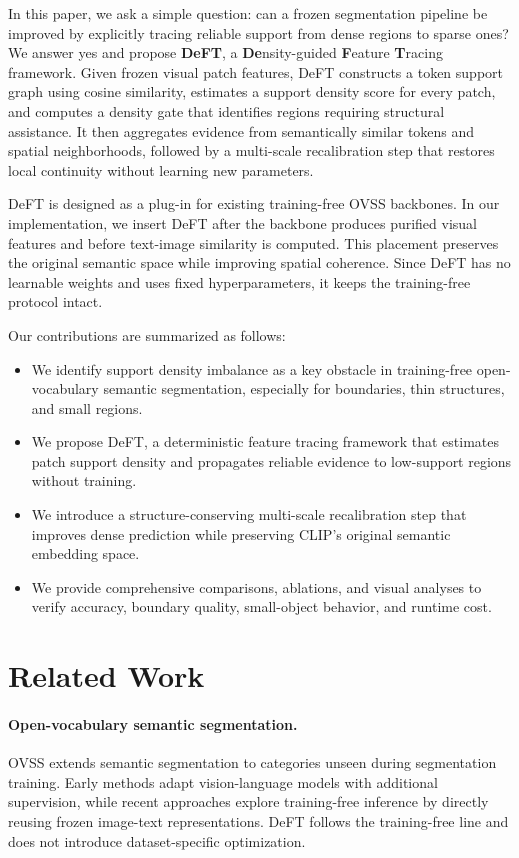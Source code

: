\documentclass[letterpaper]{article}
\begin{document}
In this paper, we ask a simple question: can a frozen segmentation pipeline be
improved by explicitly tracing reliable support from dense regions to sparse
ones? We answer yes and propose \textbf{DeFT}, a \textbf{De}nsity-guided
\textbf{F}eature \textbf{T}racing framework. Given frozen visual patch features,
DeFT constructs a token support graph using cosine similarity, estimates a
support density score for every patch, and computes a density gate that
identifies regions requiring structural assistance. It then aggregates evidence
from semantically similar tokens and spatial neighborhoods, followed by a
multi-scale recalibration step that restores local continuity without learning
new parameters.

DeFT is designed as a plug-in for existing training-free OVSS backbones. In our
implementation, we insert DeFT after the backbone produces purified visual
features and before text-image similarity is computed. This placement preserves
the original semantic space while improving spatial coherence. Since DeFT has no
learnable weights and uses fixed hyperparameters, it keeps the training-free
protocol intact.

Our contributions are summarized as follows:
\begin{itemize}
    \item We identify support density imbalance as a key obstacle in
    training-free open-vocabulary semantic segmentation, especially for
    boundaries, thin structures, and small regions.
    \item We propose DeFT, a deterministic feature tracing framework that
    estimates patch support density and propagates reliable evidence to
    low-support regions without training.
    \item We introduce a structure-conserving multi-scale recalibration step
    that improves dense prediction while preserving CLIP's original semantic
    embedding space.
    \item We provide comprehensive comparisons, ablations, and visual analyses
    to verify accuracy, boundary quality, small-object behavior, and runtime
    cost.
\end{itemize}

\section{Related Work}

\paragraph{Open-vocabulary semantic segmentation.}
OVSS extends semantic segmentation to categories unseen during segmentation
training. Early methods adapt vision-language models with additional supervision,
while recent approaches explore training-free inference by directly reusing
frozen image-text representations. DeFT follows the training-free line and does
not introduce dataset-specific optimization.
\end{document}
